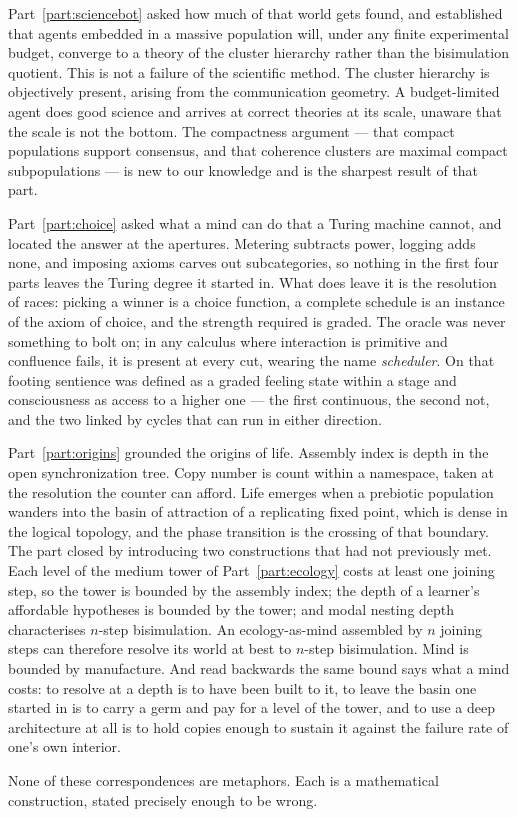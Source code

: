 Part~\ref{part:sciencebot} asked how much of that world gets found, and
established that agents embedded in a massive population will, under any
finite experimental budget, converge to a theory of the cluster hierarchy
rather than the bisimulation quotient.
This is not a failure of the scientific method.
The cluster hierarchy is objectively present, arising from the
communication geometry.
A budget-limited agent does good science and arrives at correct theories
at its scale, unaware that the scale is not the bottom.
The compactness argument --- that compact populations support consensus,
and that coherence clusters are maximal compact subpopulations --- is new
to our knowledge and is the sharpest result of that part.

Part~\ref{part:choice} asked what a mind can do that a Turing machine
cannot, and located the answer at the apertures.
Metering subtracts power, logging adds none, and imposing axioms carves
out subcategories, so nothing in the first four parts leaves the Turing
degree it started in.
What does leave it is the resolution of races: picking a winner is a
choice function, a complete schedule is an instance of the axiom of
choice, and the strength required is graded.
The oracle was never something to bolt on; in any calculus where
interaction is primitive and confluence fails, it is present at every
cut, wearing the name \emph{scheduler}.
On that footing sentience was defined as a graded feeling state within a
stage and consciousness as access to a higher one --- the first
continuous, the second not, and the two linked by cycles that can run in
either direction.

Part~\ref{part:origins} grounded the origins of life.
Assembly index is depth in the open synchronization tree.
Copy number is count within a namespace, taken at the resolution the
counter can afford.
Life emerges when a prebiotic population wanders into the basin of
attraction of a replicating fixed point, which is dense in the logical
topology, and the phase transition is the crossing of that boundary.
The part closed by introducing two constructions that had not previously
met.
Each level of the medium tower of Part~\ref{part:ecology} costs at least
one joining step, so the tower is bounded by the assembly index; the
depth of a learner's affordable hypotheses is bounded by the tower; and
modal nesting depth characterises $n$-step bisimulation.
An ecology-as-mind assembled by $n$ joining steps can therefore resolve
its world at best to $n$-step bisimulation.
Mind is bounded by manufacture.
And read backwards the same bound says what a mind costs: to resolve at a
depth is to have been built to it, to leave the basin one started in is to
carry a germ and pay for a level of the tower, and to use a deep
architecture at all is to hold copies enough to sustain it against the
failure rate of one's own interior.

None of these correspondences are metaphors.
Each is a mathematical construction, stated precisely enough to be wrong.
